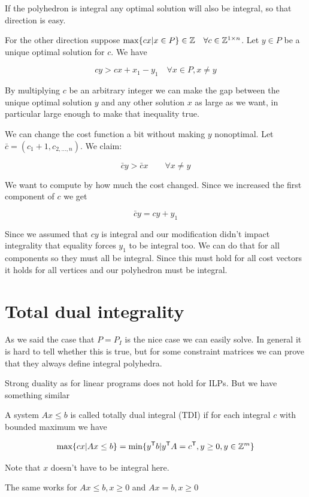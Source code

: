 \begin{pr} If the polyhedron is integral any optimal solution will also be integral, so that direction is easy.

For the other direction suppose $\max \{cx | x\in P\}\in \mathbb{Z}\quad \forall c\in \mathbb{Z}^{1\times n}$. Let $y\in P$ be a unique optimal solution for $c$. We have 

\[cy>cx + x_1 -y_1 \quad \forall x\in P,x\neq y\]

By multiplying $c$ be an arbitrary integer we can make the gap between the unique optimal solution $y$ and any other solution $x$ as large as we want, in particular large enough to make that inequality true.

We can change the cost function a bit without making $y$ nonoptimal. Let $\bar c = (c_1+1,c_{2,\ldots,n})$. We claim:

\[\bar c y > \bar c x\qquad \forall x\neq y\]

We want to compute by how much the cost changed. Since we increased the first component of $c$ we get

\[\bar c y = cy+y_1\]

Since we assumed that $cy$ is integral and our modification didn't impact integrality that equality forces $y_1$ to be integral too. We can do that for all components so they must all be integral. Since this must hold for all cost vectors it holds for all vertices and our polyhedron must be integral.
\end{pr}


\section{Total dual integrality}

As we said the case that $P=P_I$ is the nice case we can easily solve. In general it is hard to tell whether this is true, but for some constraint matrices we can prove that they always define integral polyhedra.

Strong duality as for linear programs does not hold for ILPs. But we have something similar

\begin{Def} A system $Ax\leq b$ is called totally dual integral (TDI) if for each integral $c$ with bounded maximum we have

\[\max \{cx |Ax\leq b\} = \min \{{y}^\text{\upshape \sffamily T} b | {y}^\text{\upshape \sffamily T} A = {c}^\text{\upshape \sffamily T}, y\geq 0, y\in \mathbb{Z}^m\}\]

Note that $x$ doesn't have to be integral here.

The same works for $Ax\leq b, x\geq 0$ and $Ax=b, x\geq 0$
\end{Def}

